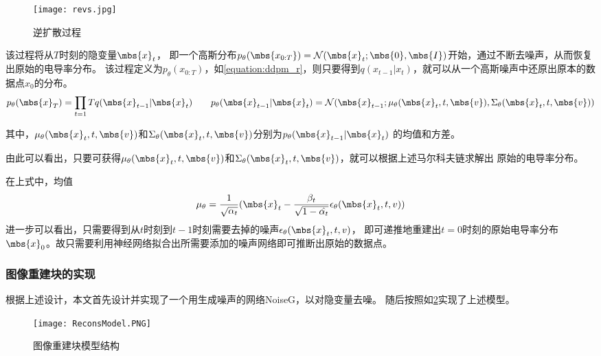 \begin{figure}[h]
    \centering
    \texttt{[image: revs.jpg]}
    \caption{逆扩散过程}
    \label{figure:revs}
\end{figure}

该过程将从$T$时刻的隐变量$\mbs{x}_{t}$，
即一个高斯分布$p_\theta(\mbs{x_{0:T}}) = \mathcal{N}(\mbs{x}_{t}; \mbs{0},\mbs{I})$开始，通过不断去噪声，从而恢复出原始的电导率分布。
该过程定义为$p_\theta(x_{0:T})$，如\cref{equation:ddpm_r}，则只要得到$q(x_{t-1}|x_t)$，就可以从一个高斯噪声中还原出原本的数据点$x_0$的分布。
\begin{equation}
    \centering
    p_\theta(\mbs{x}_{T}) = \prod_{t=1}{T} q(\mbs{x}_{t-1}|\mbs{x}_{t}) \qquad
    p_\theta(\mbs{x}_{t-1}|\mbs{x}_{t}) = \mathcal{N}(\mbs{x}_{t-1}; \mu_\theta(\mbs{x}_{t}, t, \mbs{v}), \Sigma_\theta(\mbs{x}_{t}, t, \mbs{v}))
    \label{equation:ddpm_r}
\end{equation}

其中，$\mu_\theta(\mbs{x}_{t}, t, \mbs{v})$和$\Sigma_\theta(\mbs{x}_{t}, t, \mbs{v})$分别为$p_\theta(\mbs{x}_{t-1}|\mbs{x}_{t})$
的均值和方差。

由此可以看出，只要可获得$\mu_\theta(\mbs{x}_{t}, t, \mbs{v})$和$\Sigma_\theta(\mbs{x}_{t}, t, \mbs{v})$，就可以根据上述马尔科夫链求解出
原始的电导率分布。

在上式中，均值
\begin{equation}
  \mu_\theta = \frac{1}{\sqrt{\alpha_t}}(\mbs{x}_{t} - \frac{\beta_t}{\sqrt{1-\hat{\alpha_t}}}\epsilon_\theta(\mbs{x}_{t}, t, v))  
\end{equation}
进一步可以看出，只需要得到从$t$时刻到$t-1$时刻需要去掉的噪声$\epsilon_\theta(\mbs{x}_{t}, t, v)$，
即可递推地重建出$t=0$时刻的原始电导率分布$\mbs{x}_0$。故只需要利用神经网络拟合出所需要添加的噪声网络即可推断出原始的数据点。

\subsubsection{图像重建块的实现}

根据上述设计，本文首先设计并实现了一个用生成噪声的网络NoiseG，以对隐变量去噪。
随后按照如\cref{figure:ReconsModel}实现了上述模型。


\begin{figure}[h]
    \centering
    \texttt{[image: ReconsModel.PNG]}
    \caption{图像重建块模型结构}
    \label{figure:ReconsModel}
\end{figure}

